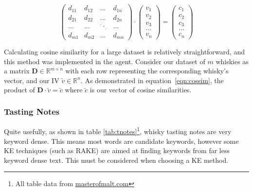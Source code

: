 \begin{equation}\label{eqn:cossim}
    \begin{pmatrix}
        d_{11} & d_{12} & ... & d_{1n}\\
        d_{21} & d_{22} & ... & d_{2n}\\
        ...    & ...    & ^{\cdot}\cdot _{\cdot} & ...   \\
        d_{m1} & d_{m2} & ... & d_{mn}
    \end{pmatrix}
    \cdot
    \begin{pmatrix}
        v_1 \\ v_2 \\ v_3 \\ ... \\ v_n
    \end{pmatrix}
    =
    \begin{pmatrix}
        c_1 \\ c_2 \\ c_3 \\ ... \\ c_n
    \end{pmatrix}
\end{equation}

Calculating cosine similarity for a large dataset is relatively straightforward,
and this method was implemented in the agent. Consider our dataset of $m$ 
whiskies as a matrix $\textbf{D} \in \mathbb{R}^{m \times n}$ with each row representing
the corresponding whisky's vector, and our IV $\utilde{v} \in \mathbb{R}^{n}$.
As demonstrated in equation~\ref{eqn:cossim}, the product of 
$\textbf{D} \cdot \utilde{v} = \utilde{c}$ where $\utilde{c}$ is our vector 
of cosine similarities.

\subsubsection{Tasting Notes}\label{ssec:tnotes}
Quite usefully, as shown in table \ref{tab:tnotes}\footnote{All table data from \href{http://masterofmalt.com/}{masterofmalt.com}}, whisky tasting notes are very keyword dense.
This means most words are candidate keywords, however some KE techniques (such as RAKE) are aimed at 
finding keywords from far less keyword dense text. This must be considered when choosing a KE method.

